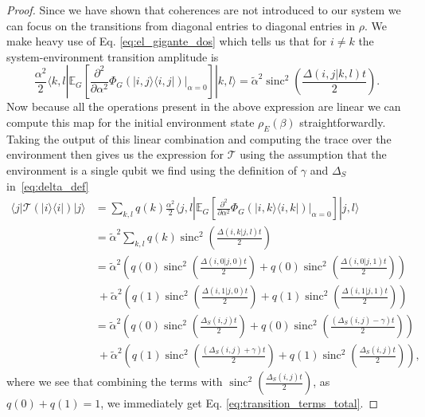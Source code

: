 \documentclass{article}
\newcommand{\ket}[1]{|#1\rangle}
\newcommand{\bra}[1]{\langle #1|}
\newcommand{\ketbra}[2]{| #1\rangle\! \langle #2|}
\DeclareMathOperator{\sinc}{sinc}
\begin{document}
\begin{proof}
    Since we have shown that coherences are not introduced to our system we can focus on the transitions from diagonal entries to diagonal entries in $\rho$. We make heavy use of Eq. \eqref{eq:el_gigante_dos} which tells us that for $i \neq k$ the system-environment transition amplitude is
    \begin{equation}
        \frac{\alpha^2}{2}\bra{k, l} \mathbb{E}_G \left[ \frac{\partial^2}{\partial \alpha^2} \Phi_G(\ketbra{i, j}{i,j}) \big|_{\alpha = 0} \right] \ket{k, l} = \widetilde{\alpha}^2 \sinc^2 \left( \frac{\Delta(i,j | k, l) t}{2} \right). 
    \end{equation}
    Now because all the operations present in the above expression are linear we can compute this map for the initial environment state $\rho_E(\beta)$ straightforwardly. Taking the output of this linear combination and computing the trace over the environment then gives us the expression for $\mathcal{T}$ using the assumption that the environment is a single qubit we find using the definition of $\gamma$ and $\Delta_S$ in~\eqref{eq:delta_def}
    \begin{align}
        \bra{j} \mathcal{T}(\ketbra{i}{i}) \ket{j} &= \sum_{k, l} q(k) \frac{\alpha^2}{2}\bra{j, l} \mathbb{E}_G \left[ \frac{\partial^2}{\partial \alpha^2} \Phi_G(\ketbra{i, k}{i,k}) \big|_{\alpha = 0} \right] \ket{j, l} \\
        &= \widetilde{\alpha}^2 \sum_{k, l} q(k) \sinc^2 \left(\frac{\Delta(i, k | j , l) t}{2} \right) \\
        &= \widetilde{\alpha}^2 \left(q(0) \sinc^2 \left(\frac{\Delta(i, 0 | j , 0) t}{2} \right) + q(0) \sinc^2 \left(\frac{\Delta(i, 0 | j , 1) t}{2} \right) \right) \nonumber \\
        & ~+ \widetilde{\alpha}^2 \left(q(1) \sinc^2 \left(\frac{\Delta(i, 1 | j , 0) t}{2} \right) + q(1) \sinc^2 \left(\frac{\Delta(i, 1 | j , 1) t}{2} \right) \right) \\
        &= \widetilde{\alpha}^2 \left(q(0) \sinc^2 \left(\frac{\Delta_S(i,j) t}{2} \right) + q(0) \sinc^2 \left(\frac{(\Delta_S(i,j) - \gamma) t}{2} \right) \right) \nonumber \\
        & ~+ \widetilde{\alpha}^2 \left(q(1) \sinc^2 \left(\frac{(\Delta_S(i, j) + \gamma) t}{2} \right) + q(1) \sinc^2 \left(\frac{\Delta_S(i,j) t}{2} \right) \right),
    \end{align}
    where we see that combining the terms with $\sinc^2 \left(\frac{\Delta_S(i,j) t}{2} \right)$, as $q(0) + q(1) = 1$, we immediately get Eq. \eqref{eq:transition_terms_total}. 


\end{proof}
\end{document}
